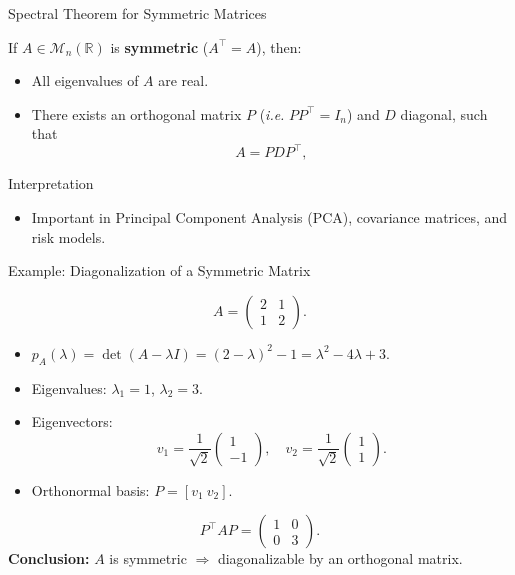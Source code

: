 \documentclass[aspectratio=169]{beamer}
\begin{document}
\begin{frame}{Spectral Theorem for Symmetric Matrices}

\begin{theorem}
If $A \in \mathcal{M}_{n} (\mathbb{R} )$ is \textbf{symmetric} ($A^\top = A$), then:
\begin{itemize}
  \item All eigenvalues of $A$ are real.
  \item There exists an orthogonal matrix $P$ (\textit{i.e.} $P P^\top = I_n$) and $D$ diagonal, such that
  \[
  A = P D P^\top,
  \]
\end{itemize}
\end{theorem}

\pause
\begin{block}{Interpretation}
\begin{itemize}
  \item Important in Principal Component Analysis (PCA), covariance matrices, and risk models.
\end{itemize}
\end{block}

\end{frame}

\begin{frame}{Example: Diagonalization of a Symmetric Matrix}

\[
A =
\begin{pmatrix}
2 & 1\\
1 & 2
\end{pmatrix}.
\]
\pause
\begin{itemize}
  \item $p_A(\lambda) = \det(A - \lambda I) = (2-\lambda)^2 - 1 = \lambda^2 - 4\lambda + 3.$
  \item Eigenvalues: $\lambda_1=1$, $\lambda_2=3.$
  \item Eigenvectors:
  \[
  v_1 = \frac{1}{\sqrt{2}}
  \begin{pmatrix}1\\-1\end{pmatrix},
  \quad
  v_2 = \frac{1}{\sqrt{2}}
  \begin{pmatrix}1\\1\end{pmatrix}.
  \]
  \item Orthonormal basis: $P = [v_1 \ v_2]$.
\end{itemize}

\pause
\[
P^\top A P = 
\begin{pmatrix}
1 & 0\\
0 & 3
\end{pmatrix}.
\]
\textbf{Conclusion:} $A$ is symmetric $\Rightarrow$ diagonalizable by an orthogonal matrix.
\end{frame}
\end{document}
